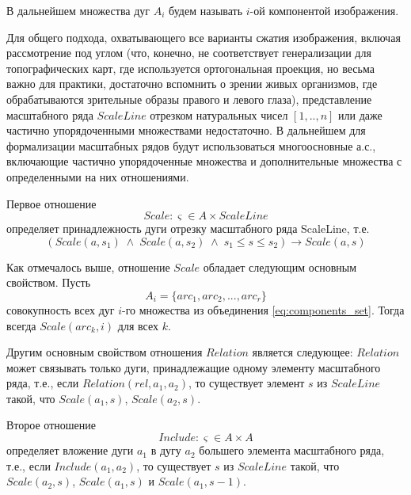 \begin{definition}
В дальнейшем множества дуг $A_i$ будем называть $i$-ой компонентой изображения.
\end{definition}


\begin{remark}
Для общего подхода, охватывающего все варианты сжатия изображения, включая рассмотрение  под углом (что, конечно,  не соответствует генерализации для топографических карт, где используется ортогональная проекция,  но весьма важно для практики, достаточно  вспомнить о зрении живых организмов, где обрабатываются зрительные образы правого и левого глаза), представление масштабного ряда $ScaleLine$ отрезком натуральных чисел $[1,.., n]$ или даже частично  упорядоченными множествами недостаточно. В дальнейшем для формализации масштабных рядов  будут использоваться многоосновные а.с., включающие частично упорядоченные множества и дополнительные множества с определенными на них отношениями. 
\end{remark}

Первое отношение
$$Scale: \varsigma \in A \times ScaleLine$$  %
определяет принадлежность дуги отрезку масштабного ряда ScaleLine, т.е.
$$(Scale(a, s_1) \;\wedge\; Scale(a, s_2) \;\wedge\; s_1\leq s \leq s_2) \to Scale(a, s) $$

Как отмечалось выше,  отношение  $Scale$  обладает следующим основным свойством. Пусть 
$$A_i = \{arc_1, arc_2, ..., arc_r\}$$ %
совокупность всех дуг $i$-го множества из объединения \ref{eq:components_set}. Тогда всегда  $Scale(arc_k, i)$  для всех $k$.  

Другим основным  свойством отношения  $Relation$ является следующее: $Relation$  может связывать только дуги, принадлежащие одному элементу масштабного ряда, т.е., если $Relation(rel, a_1, a_2)$, то существует элемент  $s$ из  $ScaleLine$ такой, что   $Scale(a_1, s)$,  $Scale(a_2,  s)$.

Второе отношение
$$Include: \varsigma \in A \times A$$  %
определяет вложение дуги $a_1$   в дугу $a_2$   большего элемента масштабного ряда, т.е., если $Include ( a_1, a_2)$,  то  существует  $s$ из  $ScaleLine$ такой, что $Scale(a_2, s)$,  $Scale(a_1,  s)$  и   $Scale(a_1,  s-1)$.

